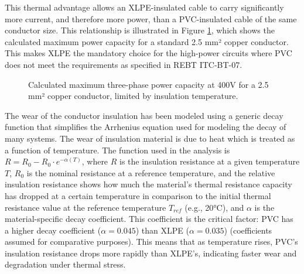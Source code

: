 \documentclass[12pt, a4paper]{article}
\begin{document}
This thermal advantage allows an XLPE-insulated cable to carry significantly more current, and therefore more power, than a PVC-insulated cable of the same conductor size. This relationship is illustrated in Figure \ref{fig:power_capacity}, which shows the calculated maximum power capacity for a standard 2.5 mm² copper conductor. This makes XLPE the mandatory choice for the high-power circuits where PVC does not meet the requirements as specified in REBT ITC-BT-07.

\begin{figure}[h!]
    \centering
    \caption{Calculated maximum three-phase power capacity at 400V for a 2.5 mm² copper conductor, limited by insulation temperature.}
    \label{fig:power_capacity}
\end{figure}

The wear of the conductor insulation has been modeled using a generic decay function that simplifies the Arrhenius equation used for modeling the decay of many systems.
The wear of insulation material is due to heat which is treated as a function of temperature. The function used in the analysis is $R = R_0- R_0 \cdot e^{-\alpha(T )}$, where $R$ is the insulation resistance at a given temperature $T$, $R_0$ is the nominal resistance at a reference temperature, and the relative insulation resistance shows how much the material's thermal resistance capacity has dropped at a certain temperature in comparison to the initial thermal resistance value at the reference temperature $T_{ref}$ (e.g., 20°C), and $\alpha$ is the material-specific decay coefficient. This coefficient is the critical factor: PVC has a higher decay coefficient ($\alpha=0.045$) than XLPE ($\alpha=0.035$) (coefficients assumed for comparative purposes). This means that as temperature rises, PVC's insulation resistance drops more rapidly than XLPE's, indicating faster wear and degradation under thermal stress. 
\end{document}
